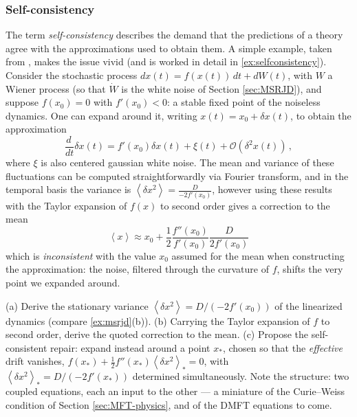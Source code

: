 \documentclass[11pt]{article}
\newcommand{\expval}[1]{\left\langle #1 \right\rangle}
\newcommand{\dv}[2]{\frac{d #1}{d #2}}
\begin{document}
\subsubsection{Self-consistency}

The term \emph{self-consistency} describes the demand that the predictions of a theory agree with the approximations used to obtain them. A simple example, taken from \cite{stapmannsSelfconsistentFormulationsStochastic2020}, makes the issue vivid (and is worked in detail in \cref{ex:selfconsistency}). Consider the stochastic process $d x (t) = f (x(t))\, d t + dW(t)$, with $W$ a Wiener process (so that $\dot W$ is the white noise of Section \ref{sec:MSRJD}), and suppose $f(x_0) = 0$ with $f'(x_0)<0$: a stable fixed point of the noiseless dynamics. One can expand around it, writing $x(t) = x_0 + \delta x(t)$, to obtain the approximation
\begin{equation}
    \dv{\,}{t}\delta x(t) = f'(x_0) \delta x(t) + \xi(t) + \mathcal{O}(\delta ^2 x(t))\,,
\end{equation}
where $\xi$ is also centered gaussian white noise.  The mean and variance of these fluctuations can be computed straightforwardly via Fourier transform, and in the temporal basis the variance is $\expval{\delta x^2} = \frac{D}{- 2 f'(x_0)}$, however using these results with the Taylor expansion of $f(x)$ to second order gives a correction to the mean
\begin{equation}
    \expval{x} \approx x_0 + \frac{1}{2} \frac{f''(x_0)}{f'(x_0)} \frac{D}{2 f'(x_0)} 
\end{equation}
which is \emph{inconsistent} with the value $x_0$ assumed for the mean when constructing the approximation: the noise, filtered through the curvature of $f$, shifts the very point we expanded around.

\begin{exercise}
\label{ex:selfconsistency}
(a) Derive the stationary variance $\expval{\delta x^2} = D/(-2f'(x_0))$ of the linearized dynamics (compare \cref{ex:msrjd}(b)).
(b) Carrying the Taylor expansion of $f$ to second order, derive the quoted correction to the mean.
(c) Propose the self-consistent repair: expand instead around a point $x_*$, chosen so that the \emph{effective} drift vanishes, $f(x_*) + \tfrac{1}{2} f''(x_*)\expval{\delta x^2}_* = 0$, with $\expval{\delta x^2}_* = D/(-2f'(x_*))$ determined simultaneously. Note the structure: two coupled equations, each an input to the other --- a miniature of the Curie--Weiss condition of Section \ref{sec:MFT-physics}, and of the DMFT equations to come.
\end{exercise}
\end{document}
